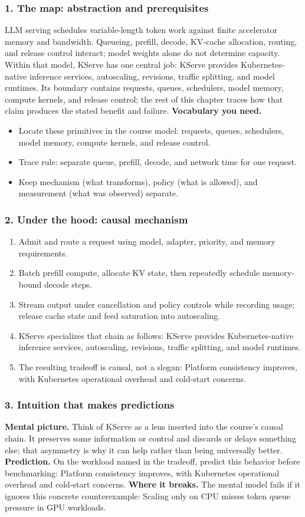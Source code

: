 \subsubsection*{1. The map: abstraction and prerequisites}
LLM serving schedules variable-length token work against finite accelerator memory and bandwidth. Queueing, prefill, decode, KV-cache allocation, routing, and release control interact; model weights alone do not determine capacity.
Within that model, KServe has one central job: KServe provides Kubernetes-native inference services, autoscaling, revisions, traffic splitting, and model runtimes. Its boundary contains requests, queues, schedulers, model memory, compute kernels, and release control; the rest of this chapter traces how that claim produces the stated benefit and failure.
\textbf{Vocabulary you need.}\begin{itemize}
\item Locate these primitives in the course model: requests, queues, schedulers, model memory, compute kernels, and release control.
\item Trace rule: separate queue, prefill, decode, and network time for one request.
\item Keep mechanism (what transforms), policy (what is allowed), and measurement (what was observed) separate.
\end{itemize}
\subsubsection*{2. Under the hood: causal mechanism}\begin{enumerate}
\item Admit and route a request using model, adapter, priority, and memory requirements.
\item Batch prefill compute, allocate KV state, then repeatedly schedule memory-bound decode steps.
\item Stream output under cancellation and policy controls while recording usage; release cache state and feed saturation into autoscaling.
\item KServe specializes that chain as follows: KServe provides Kubernetes-native inference services, autoscaling, revisions, traffic splitting, and model runtimes.
\item The resulting tradeoff is causal, not a slogan: Platform consistency improves, with Kubernetes operational overhead and cold-start concerns.
\end{enumerate}
\subsubsection*{3. Intuition that makes predictions}
\textbf{Mental picture.} Think of KServe as a lens inserted into the course's causal chain. It preserves some information or control and discards or delays something else; that asymmetry is why it can help rather than being universally better.
\textbf{Prediction.} On the workload named in the tradeoff, predict this behavior before benchmarking: Platform consistency improves, with Kubernetes operational overhead and cold-start concerns.
\textbf{Where it breaks.} The mental model fails if it ignores this concrete counterexample: Scaling only on CPU misses token queue pressure in GPU workloads.
